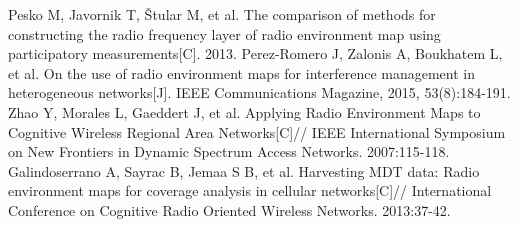 \documentclass[UTF8]{ctexart}
\begin{document}
\begin{thebibliography}{99}
   Pesko M, Javornik T, Štular M, et al. The comparison of
  methods for constructing the radio frequency layer of radio environment
  map using participatory measurements[C]. 2013.
   Perez-Romero J, Zalonis A, Boukhatem L, et al. On the use
  of radio environment maps for interference management in heterogeneous
  networks[J]. IEEE Communications Magazine, 2015, 53(8):184-191.
   Zhao Y, Morales L, Gaeddert J, et al. Applying Radio Environment
  Maps to Cognitive Wireless Regional Area Networks[C]// IEEE International
  Symposium on New Frontiers in Dynamic Spectrum Access Networks. 2007:115-118.
   Galindoserrano A, Sayrac B, Jemaa S B, et al. Harvesting MDT
  data: Radio environment maps for coverage analysis in cellular networks[C]//
  International Conference on Cognitive Radio Oriented Wireless Networks. 2013:37-42.


\end{thebibliography}
\end{document}
